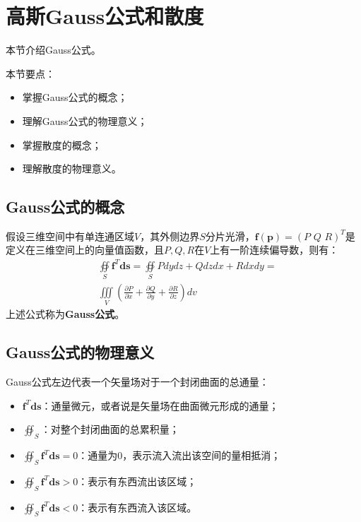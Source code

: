 \section{高斯Gauss公式和散度}

本节介绍Gauss公式。

本节要点：
\begin{itemize}
    \item 掌握Gauss公式的概念；
    \item 理解Gauss公式的物理意义；
    \item 掌握散度的概念；
    \item 理解散度的物理意义。
\end{itemize}

\subsection{Gauss公式的概念}

\begin{definition}[Gauss公式]
假设三维空间中有单连通区域$V$，其外侧边界$S$分片光滑，$\boldsymbol{f}\left( \boldsymbol{p} \right) =\left( P\,\,Q\,\,R \right) ^T$是定义在三维空间上的向量值函数，且$P,Q,R$在$V$上有一阶连续偏导数，则有：
\begin{align*}
&\oiint\limits_S{\boldsymbol{f}^T\boldsymbol{ds}}=\oiint\limits_S{Pdydz+Qdzdx+Rdxdy}= \\
&\iiint\limits_V{\left( \frac{\partial P}{\partial x}+\frac{\partial Q}{\partial y}+\frac{\partial R}{\partial z} \right) dv}
\end{align*}
上述公式称为{\bf Gauss公式}。
\end{definition}

\subsection{Gauss公式的物理意义}

Gauss公式左边代表一个矢量场对于一个封闭曲面的总通量：
\begin{itemize}
    \item $\boldsymbol{f}^T\boldsymbol{ds}$：通量微元，或者说是矢量场在曲面微元形成的通量；
    \item $\oiint_S$：对整个封闭曲面的总累积量；
    \item $\oiint_S{\boldsymbol{f}^T\boldsymbol{ds}}=0$：通量为0，表示流入流出该空间的量相抵消；
    \item $\oiint_S{\boldsymbol{f}^T\boldsymbol{ds}}>0$：表示有东西流出该区域；
    \item $\oiint_S{\boldsymbol{f}^T\boldsymbol{ds}}<0$：表示有东西流入该区域。
\end{itemize}

